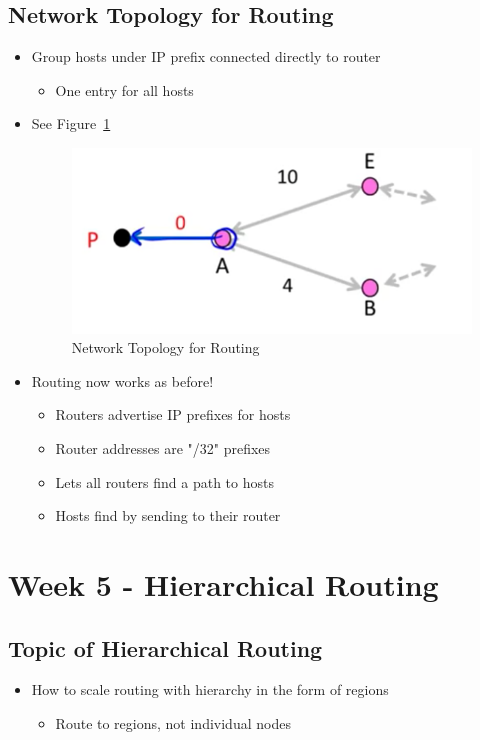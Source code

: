 \documentclass[12pt]{ctexart}   %
\begin{document}
	\subsection{Network Topology for Routing}
	\begin{itemize}
		\item Group hosts under IP prefix connected directly to router
		\begin{itemize}
			\item One entry for all hosts
		\end{itemize}
		\item See Figure~\ref{fig:5-8-2}
			
		\begin{figure}[h!] %
		\centering
		 \includegraphics[scale=0.7]{images/5-8-2}
		\caption{ Network Topology for Routing }
		 \label{fig:5-8-2}
		 \end{figure}
		 
		 \item Routing now works as before!
		 \begin{itemize}
		 	\item Routers advertise IP prefixes for hosts
		 	\item Router addresses are "/32" prefixes
		 	\item Lets all routers find a path to hosts
		 	\item Hosts find by sending to their router
		 \end{itemize}
	\end{itemize}

\section{Week 5 - Hierarchical Routing}
	\subsection{Topic of Hierarchical Routing}
	\begin{itemize}
		\item How to scale routing with hierarchy in the form of regions
		\begin{itemize}
			\item Route to regions, not individual nodes
		\end{itemize}
	\end{itemize}
	
\end{document}
